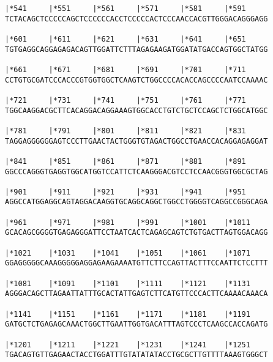 \documentclass{article}
\begin{document}
\begin{Verbatim}
|*541     |*551     |*561     |*571     |*581     |*591     
TCTACAGCTCCCCCAGCTCCCCCCACCTCCCCCACTCCCAACCACGTTGGGACAGGGAGG
                                                            
|*601     |*611     |*621     |*631     |*641     |*651     
TGTGAGGCAGGAGAGACAGTTGGATTCTTTAGAGAAGATGGATATGACCAGTGGCTATGG
                                                            
|*661     |*671     |*681     |*691     |*701     |*711     
CCTGTGCGATCCCACCCGTGGTGGCTCAAGTCTGGCCCCACACCAGCCCCAATCCAAAAC
                                                            
|*721     |*731     |*741     |*751     |*761     |*771     
TGGCAAGGACGCTTCACAGGACAGGAAAGTGGCACCTGTCTGCTCCAGCTCTGGCATGGC
                                                            
|*781     |*791     |*801     |*811     |*821     |*831     
TAGGAGGGGGGAGTCCCTTGAACTACTGGGTGTAGACTGGCCTGAACCACAGGAGAGGAT
                                                            
|*841     |*851     |*861     |*871     |*881     |*891     
GGCCCAGGGTGAGGTGGCATGGTCCATTCTCAAGGGACGTCCTCCAACGGGTGGCGCTAG
                                                            
|*901     |*911     |*921     |*931     |*941     |*951     
AGGCCATGGAGGCAGTAGGACAAGGTGCAGGCAGGCTGGCCTGGGGTCAGGCCGGGCAGA
                                                            
|*961     |*971     |*981     |*991     |*1001    |*1011    
GCACAGCGGGGTGAGAGGGATTCCTAATCACTCAGAGCAGTCTGTGACTTAGTGGACAGG
                                                            
|*1021    |*1031    |*1041    |*1051    |*1061    |*1071    
GGAGGGGGCAAAGGGGGAGGAGAAGAAAATGTTCTTCCAGTTACTTTCCAATTCTCCTTT
                                                            
|*1081    |*1091    |*1101    |*1111    |*1121    |*1131    
AGGGACAGCTTAGAATTATTTGCACTATTGAGTCTTCATGTTCCCACTTCAAAACAAACA
                                                            
|*1141    |*1151    |*1161    |*1171    |*1181    |*1191    
GATGCTCTGAGAGCAAACTGGCTTGAATTGGTGACATTTAGTCCCTCAAGCCACCAGATG
                                                            
|*1201    |*1211    |*1221    |*1231    |*1241    |*1251    
TGACAGTGTTGAGAACTACCTGGATTTGTATATATACCTGCGCTTGTTTTAAAGTGGGCT
                                                            

\end{Verbatim}
\end{document}
